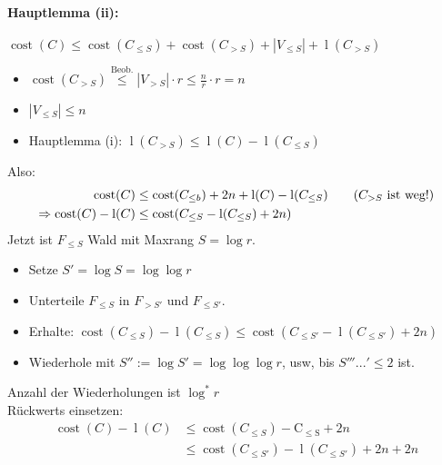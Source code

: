 \begin{itemize}
\begin{itemize}
         \paragraph*{Hauptlemma (ii):} $\operatorname{cost}(C) \leq \operatorname{cost}(C_{\leq S}) + \operatorname{cost}(C_{> S}) + |V_{\leq S}| + \operatorname{l}(C_{> S})$
         \begin{itemize}
         \item $\operatorname{cost}(C_{>S}) \overset{\text{Beob.}}{\leq} |V_{>S}| \cdot r \leq \frac{n}{r} \cdot r = n$
         \item $|V_{\leq S}| \leq n$
         \item Hauptlemma (i): $\operatorname{l}(C_{> S}) \leq \operatorname{l}(C) - \operatorname{l}(C_{\leq S})$
         \end{itemize}
         Also:
         \begin{align*}
          \operatorname{cost}(C) &\leq \operatorname{cost}(C_{\leq b}) + 2n + \operatorname{l}(C) - \operatorname{l}(C_{\leq S}) \tag{$C_{>S}$ ist weg!}\\
          \Rightarrow \operatorname{cost}(C) - \operatorname{l}(C) &\leq \operatorname{cost}(C_{\leq S} - \operatorname{l}(C_{\leq S}) + 2n)
         \end{align*}
         Jetzt ist $F_{\leq S}$ Wald mit Maxrang $S = \log r$.
         \begin{itemize}
          \item Setze $S' = \log S = \log \log r$
          \item Unterteile $F_{\leq S}$ in $F_{>S'}$ und $F_{\leq S'}$.
          \item Erhalte: $\operatorname{cost}(C_{\leq S}) - \operatorname{l}(C_{\leq S}) \leq \operatorname{cost}(C_{\leq S'} - \operatorname{l}(C_{\leq S'}) + 2n)$
          \item Wiederhole mit $S'' := \log S' = \log \log \log r$, usw, bis $S'''...' \leq 2$ ist. 
         \end{itemize}
         Anzahl der Wiederholungen ist $\log^{*} r$\\
         Rückwerts einsetzen:
         \begin{align*}
          \operatorname{cost}(C) - \operatorname{l}(C) &\leq \operatorname{cost}(C_{\leq S}) - \operatorname{C_{\leq S}} + 2n \\
                                                       &\leq \operatorname{cost}(C_{\leq S'}) - \operatorname{l}(C_{\leq S'}) + 2n + 2n\\

\end{align*}
\end{itemize}
\end{itemize}
